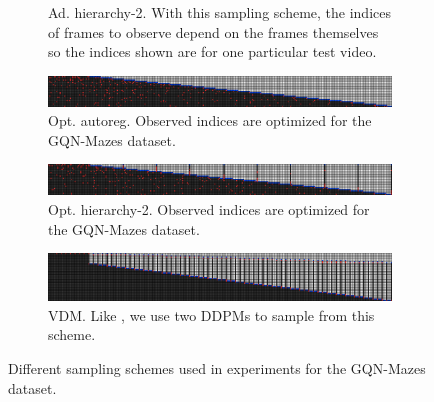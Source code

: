 \begin{figure}[h]
\begin{subfigure}[t]{\textwidth}
        \caption{Ad. hierarchy-2. With this sampling scheme, the indices of frames to observe depend on the frames themselves so the indices shown are for one particular test video.}
    \end{subfigure}
    \begin{subfigure}[t]{\textwidth}
        \includegraphics[width=\textwidth]{figs/fdm/inference-modes/sample_vis_autoreg_optimal-linspace-t-force-nearby_T=300_sampling_10_out_of_20_red_blue_flipped.png}
        \caption{Opt. autoreg. Observed indices are optimized for the GQN-Mazes dataset.} \label{fig:fdm-opt-autoreg}
    \end{subfigure}
    \begin{subfigure}[t]{\textwidth}
        \includegraphics[width=\textwidth]{figs/fdm/inference-modes/sample_vis_hierarchy-2_optimal-linspace-t-force-nearby_T=300_sampling_10_out_of_20_red_blue_flipped.png}
        \caption{Opt. hierarchy-2. Observed indices are optimized for the GQN-Mazes dataset.} \label{fig:fdm-opt-hierarchy-2}
    \end{subfigure}
    \begin{subfigure}[t]{\textwidth}
        \includegraphics[width=\textwidth]{figs/fdm/inference-modes/sample_vis_google_T=300_sampling_None_out_of_None_red_blue_flipped.png}
        \caption{VDM. Like \citet{ho2022video}, we use two DDPMs to sample from this scheme.}
    \end{subfigure}
    \caption{Different sampling schemes used in experiments for the GQN-Mazes dataset.}
    \label{fig:fdm-sampling-schemes}
\end{figure}


